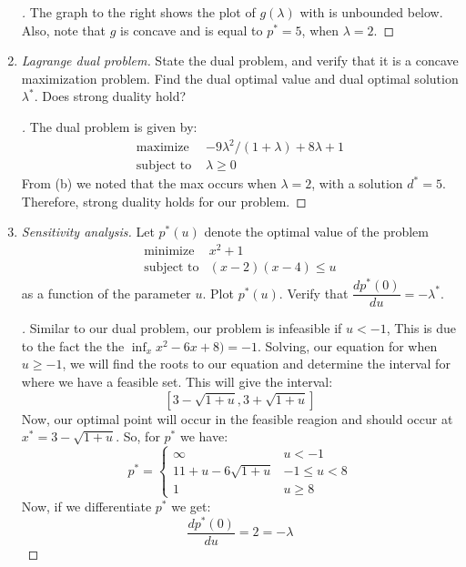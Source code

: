 \begin{enumerate}[label=(\alph*)]
{\begin{proof}[\sol]
      The graph to the right shows the plot of $g(\lambda)$ with is unbounded below. Also, note that $g$ is concave and is equal to $p^{*} = 5$, when $\lambda = 2$.
      
    \end{proof}
  }
   \item{\textit{Lagrange dual problem.} State the dual problem, and verify that it is a concave maximization problem. Find the dual optimal value and dual optimal solution $\lambda^{*}$. Does strong duality hold?
     \begin{proof}[\sol]
       The dual problem is given by:
       \begin{eqnarray*}
         \mbox{maximize } & -9\lambda^{2}/(1+\lambda) + 8\lambda + 1\\
         \mbox{subject to } & \lambda \geq 0
       \end{eqnarray*}
       From (b) we noted that the max occurs when $\lambda = 2$, with a solution $d^{*} = 5$.  Therefore, strong duality holds for our problem.
    \end{proof}
   }
   \item{\textit{Sensitivity analysis.} Let $p^{*}(u)$ denote the optimal value of the problem
       \begin{eqnarray*}
    \mbox{minimize} & x^{2} + 1\\
    \mbox{subject to} & (x-2)(x-4) \leq u
       \end{eqnarray*}
       as a function of the parameter $u$. Plot $p^{*}(u)$. Verify that $\dfrac{dp^{*}(0)}{du} = -\lambda^{*}$.
       \begin{proof}[\sol]
         Similar to our dual problem, our problem is infeasible if $u < -1$,
         This is due to the fact the the $\inf_{x} x^{2} - 6x + 8) = -1$. Solving, our equation for when $u \geq -1$, we will find the roots to our equation and determine the interval for where we have a feasible set.  This will give the interval:
         \[
         \left [ 3 - \sqrt{1 + u}, 3 + \sqrt{1 + u}\right]
         \]
         Now, our optimal point will occur in the feasible reagion and should occur at $x^{*} = 3 - \sqrt{1 + u}$. So, for $p^{*}$ we have:
         \[
         p^{*} =
      \begin{cases}
          \infty& u < -1\\ 
          11 + u - 6 \sqrt{1+u} & -1 \leq u < 8\\
          1 & u \geq 8
      \end{cases}
      \]
      Now, if we differentiate $p^{*}$ we get:
      \[
      \frac{dp^{*}(0)}{du} = 2 = -\lambda
      \]
         
    \end{proof}
   }
  \end{enumerate}

